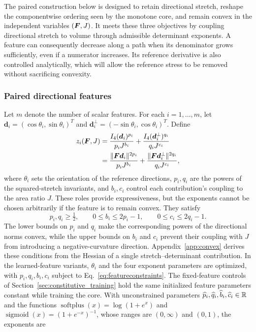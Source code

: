 The paired construction below is designed to retain directional stretch, reshape the componentwise ordering seen by the monotone core, and remain convex in the independent variables $(\bm F,J)$. It meets these three objectives by coupling directional stretch to volume through admissible determinant exponents. A feature can consequently decrease along a path when its denominator grows sufficiently, even if a numerator increases. Its reference derivative is also controlled analytically, which will allow the reference stress to be removed without sacrificing convexity.

\subsubsection{Paired directional features}
Let $m$ denote the number of scalar features. For each $i=1,\ldots,m$, let $\bm d_i=(\cos\theta_i,\sin\theta_i)^T$ and $\bm d_i^\perp=(-\sin\theta_i,\cos\theta_i)^T$. Define
\begin{equation}
 \begin{aligned}
 z_i(\bm F,J)
 &=\frac{I_4(\bm d_i)^{p_i}}{p_i J^{b_i}}
          +\frac{I_4(\bm d_i^\perp)^{q_i}}{q_i J^{c_i}}\\
 &=\frac{\|\bm F\bm d_i\|^{2p_i}}{p_i J^{b_i}}
          +\frac{\|\bm F\bm d_i^\perp\|^{2q_i}}{q_i J^{c_i}},
 \end{aligned}
 \label{eq:features}
\end{equation}
where $\theta_i$ sets the orientation of the reference directions, $p_i,q_i$ are the powers of the squared-stretch invariants, and $b_i,c_i$ control each contribution's coupling to the area ratio $J$. These roles provide expressiveness, but the exponents cannot be chosen arbitrarily if the feature is to remain convex. They satisfy
\begin{equation}
 p_i,q_i\geq\tfrac12,\qquad
 0\leq b_i\leq2p_i-1,\qquad 0\leq c_i\leq2q_i-1.
 \label{eq:featureconstraints}
\end{equation}
The lower bounds on $p_i$ and $q_i$ make the corresponding powers of the directional norms convex, while the upper bounds on $b_i$ and $c_i$ prevent their coupling with $J$ from introducing a negative-curvature direction. Appendix~\ref{app:convex} derives these conditions from the Hessian of a single stretch--determinant contribution.
In the learned-feature variants, $\theta_i$ and the four exponent parameters are optimized, with $p_i,q_i,b_i,c_i$ subject to Eq.~\eqref{eq:featureconstraints}. The fixed-feature controls of Section~\ref{sec:constitutive_training} hold the same initialized feature parameters constant while training the core. With unconstrained parameters $\widehat p_i,\widehat q_i,\widehat b_i,\widehat c_i\in\mathbb R$ and the functions $\operatorname{softplus}(x)=\log(1+e^x)$ and $\operatorname{sigmoid}(x)=(1+e^{-x})^{-1}$, whose ranges are $(0,\infty)$ and $(0,1)$, the exponents are
